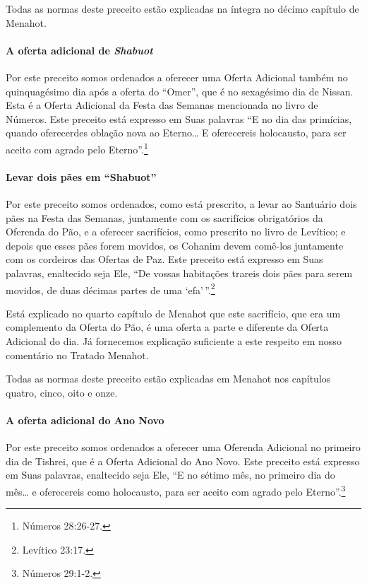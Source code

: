 Todas as normas deste preceito estão explicadas na íntegra no décimo
capítulo de Menahot.


\paragraph{A oferta adicional de \textit{Shabuot}}

Por este preceito somos ordenados a oferecer uma Oferta Adicional também
no quinquagésimo dia após a oferta do ``Omer'', que é no sexagésimo dia
de Nissan. Esta é a Oferta Adicional da Festa das Semanas mencionada no
livro de Números. Este preceito está expresso em Suas palavras ``E no
dia das primícias, quando oferecerdes oblação nova ao Eterno\ldots{} E
oferecereis holocausto, para ser aceito com agrado pelo Eterno''.\footnote{Números 28:26-27.}

\paragraph{Levar dois pães em ``Shabuot''}

Por este preceito somos ordenados, como está prescrito, a levar ao
Santuário dois pães na Festa das Semanas, juntamente com os sacrifícios
obrigatórios da Oferenda do Pão, e a oferecer sacrifícios, como
prescrito no livro de Levítico; e depois que esses pães forem movidos,
os Cohanim devem comê-los juntamente com os cordeiros das Ofertas de
Paz. Este preceito está expresso em Suas palavras, enaltecido seja Ele,
``De vossas habitações trareis dois pães para serem movidos, de duas
décimas partes de uma `efa'\,''.\footnote{Levítico 23:17.}

Está explicado no quarto capítulo de Menahot que este sacrifício, que
era um complemento da Oferta do Pão, é uma oferta a parte e diferente da
Oferta Adicional do dia. Já fornecemos explicação suficiente a este
respeito em nosso comentário no Tratado Menahot.

Todas as normas deste preceito estão explicadas em Menahot nos capítulos
quatro, cinco, oito e onze.

\paragraph{A oferta adicional do Ano Novo}

Por este preceito somos ordenados a oferecer uma Oferenda Adicional no
primeiro dia de Tishrei, que é a Oferta Adicional do Ano Novo. Este
preceito está expresso em Suas palavras, enaltecido seja Ele, ``E no
sétimo mês, no primeiro dia do mês\ldots{} e oferecereis como holocausto,
para ser aceito com agrado pelo Eterno''.\footnote{Números 29:1-2.}

